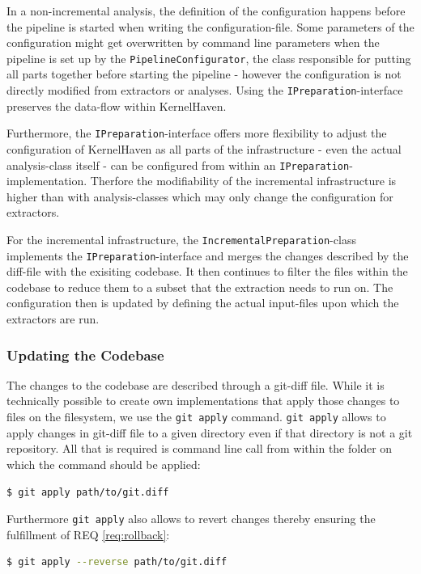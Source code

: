 \documentclass[a4paper]{article}
\begin{document}
In a non-incremental analysis, the definition of the configuration happens before the pipeline is started when writing the configuration-file. Some parameters of the configuration might get overwritten by command line parameters when the pipeline is set up by the \texttt{PipelineConfigurator}, the class responsible for putting all parts together before starting the pipeline - however the configuration is not directly modified from extractors or analyses. Using the \texttt{IPreparation}-interface preserves the data-flow within KernelHaven.

Furthermore, the \texttt{IPreparation}-interface offers more flexibility to adjust the configuration of KernelHaven as all parts of the infrastructure - even the actual analysis-class itself - can be configured from within an \texttt{IPreparation}-implementation. Therfore the modifiability of the incremental infrastructure is higher than with analysis-classes which may only change the configuration for extractors.

For the incremental infrastructure, the \texttt{IncrementalPreparation}-class implements the \texttt{IPreparation}-interface and merges the changes described by the diff-file with the exisiting codebase. It then continues to filter the files within the codebase to reduce them to a subset that the extraction needs to run on. The configuration then is updated by defining the actual input-files upon which the extractors are run.

\subsubsection{Updating the Codebase}\label{git-apply}

The changes to the codebase are described through a git-diff file. While it is technically possible to create own implementations that apply those changes to files on the filesystem, we use the \texttt{git apply} command. \texttt{git apply} allows to apply changes in git-diff file to a given directory even if that directory is not a git repository. All that is required is command line call from within the folder on which the command should be applied:

\begin{lstlisting}[language=bash]
  $ git apply path/to/git.diff
\end{lstlisting}

 Furthermore \texttt{git apply} also allows to revert changes thereby ensuring the fulfillment of REQ \ref{req:rollback}:
 \begin{lstlisting}[language=bash]
  $ git apply --reverse path/to/git.diff
\end{lstlisting}
 
\end{document}
